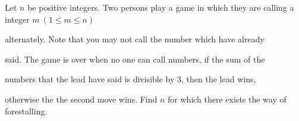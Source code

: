 Let $n$ be positive integers. Two persons play a game in which they are calling a integer $m\ (1\leq m\leq n)$

 alternately. Note that you may not call the number which have already 

said. The game is over when no one can call numbers, if the sum of the 

numbers that the lead have said  is divisible by 3, then the lead wins, 

otherwise the the second move wins. Find $n$ for which there exists the way of forestalling.